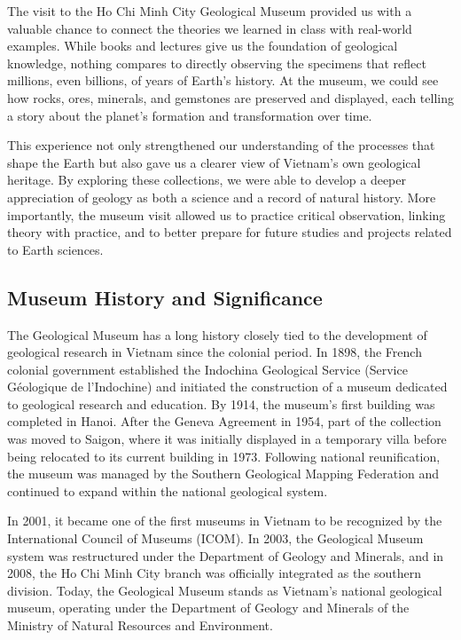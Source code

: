 The visit to the Ho Chi Minh City Geological Museum provided us with a valuable chance to connect the theories we learned in class with real-world examples. While books and lectures give us the foundation of geological knowledge, nothing compares to directly observing the specimens that reflect millions, even billions, of years of Earth's history. At the museum, we could see how rocks, ores, minerals, and gemstones are preserved and displayed, each telling a story about the planet's formation and transformation over time.

This experience not only strengthened our understanding of the processes that shape the Earth but also gave us a clearer view of Vietnam's own geological heritage. By exploring these collections, we were able to develop a deeper appreciation of geology as both a science and a record of natural history. More importantly, the museum visit allowed us to practice critical observation, linking theory with practice, and to better prepare for future studies and projects related to Earth sciences.

\subsection{Museum History and Significance}
\label{subsec:museum-history}

The Geological Museum has a long history closely tied to the development of geological research in Vietnam since the colonial period. In 1898, the French colonial government established the Indochina Geological Service (Service Géologique de l'Indochine) and initiated the construction of a museum dedicated to geological research and education. By 1914, the museum's first building was completed in Hanoi. After the Geneva Agreement in 1954, part of the collection was moved to Saigon, where it was initially displayed in a temporary villa before being relocated to its current building in 1973. Following national reunification, the museum was managed by the Southern Geological Mapping Federation and continued to expand within the national geological system.

In 2001, it became one of the first museums in Vietnam to be recognized by the International Council of Museums (ICOM). In 2003, the Geological Museum system was restructured under the Department of Geology and Minerals, and in 2008, the Ho Chi Minh City branch was officially integrated as the southern division. Today, the Geological Museum stands as Vietnam's national geological museum, operating under the Department of Geology and Minerals of the Ministry of Natural Resources and Environment.

